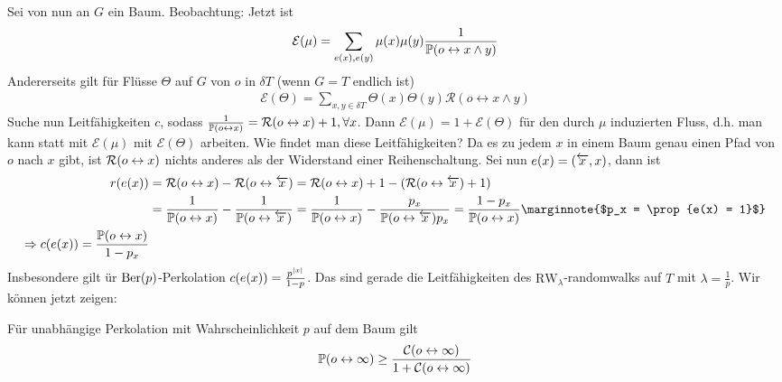 Sei von nun an $G$ ein Baum. Beobachtung: Jetzt ist 
\begin{align}
	\mathcal{E}(\mu)  = \sum\limits_{e(x),e(y)}\mu(x)\mu(y) \frac{1}{\propE{o \leftrightarrow x \land y}}
\end{align}
Andererseits gilt für Flüsse $\Theta$ auf $G$ von $o$ in $\delta T$ (wenn $G=T$ endlich ist)
\begin{align}
	\mathcal{E}(\Theta) = \sum\limits_{x,y \in \delta T}\Theta(x) \Theta(y) \mathcal{R}(o \leftrightarrow x\land y)
\end{align}
Suche nun Leitfähigkeiten $c$, sodass $\frac{1}{\propE{o \leftrightarrow x}} = \mathcal{R}\enb{o \leftrightarrow x} +1, \forall x$. Dann $\mathcal{E}(\mu) = 1 + \mathcal{E}(\Theta)$ für den durch $\mu$ induzierten Fluss, d.h. man kann statt mit $\mathcal{E}(\mu)$ mit $\mathcal{E}(\Theta)$ arbeiten. 
Wie findet man diese Leitfähigkeiten? Da es zu jedem $x$ in einem Baum genau einen Pfad von $o$ nach $x$ gibt, ist $\mathcal{R}\enb{o \leftrightarrow x}$ nichts anderes als der Widerstand einer Reihenschaltung. Sei nun $e(x) = \left(\overleftarrow{x},x\right)$, dann ist 
\begin{align} 
		r(e(x)) &= \mathcal{R} (o \leftrightarrow x) - \mathcal{R}\enb{o \leftrightarrow \overleftarrow{x}} = \mathcal{R} \enb{o \leftrightarrow x} + 1 - \enb{\mathcal{R}(o \leftrightarrow \overleftarrow 
		{x}) +1} \\
		&= \frac{1}{\prop{o \leftrightarrow x}} - \frac{1}{\prop{o \leftrightarrow \overleftarrow{x}}} = \frac{1}{\prop{o \leftrightarrow x}} - \frac{p_x}{\prop{o \leftrightarrow \overleftarrow{x}} p_x } = \frac{1-p_x}{\prop{o \leftrightarrow x}} \marginnote{$p_x = \prop{e(x) = 1}$} \\
		\Rightarrow c(e(x)) = \frac{\prop{o \leftrightarrow x}}{1-p_x}
\end{align}
Insbesondere gilt ür $\operatorname{Ber}(p)$-Perkolation $c(e(x)) = \frac{p^{\lvert x\rvert}}{1-p}$. Das sind gerade die Leitfähigkeiten des $\text{RW}_{\lambda}$-randomwalks auf $T$ mit $\lambda = \frac{1}{p}$. Wir können jetzt zeigen:
\begin{satz}[Lyons '90]
	Für unabhängige Perkolation mit Wahrscheinlichkeit $p$ auf dem Baum gilt
	\begin{align}
		\propE{o \leftrightarrow \infty} \geq \frac{\mathcal{C}(o \leftrightarrow \infty)}{1+ \mathcal{C}\enb{o \leftrightarrow \infty}}
	\end{align}	
\end{satz}
